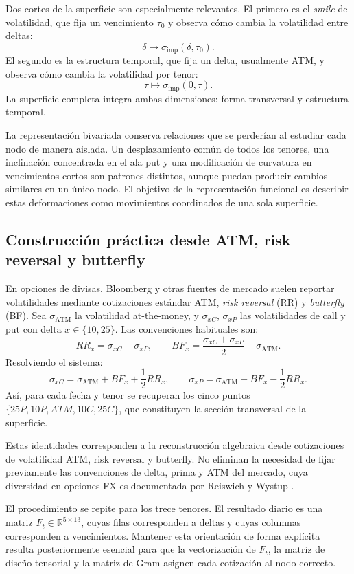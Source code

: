 \documentclass[a4paper,11pt]{article}
\newcommand{\R}{\mathbb{R}}
\begin{document}
Dos cortes de la superficie son especialmente relevantes. El primero es el \emph{smile} de volatilidad, que fija un vencimiento \(\tau_0\) y observa cómo cambia la volatilidad entre deltas:
\[
  \delta\mapsto \sigma_{\text{imp}}(\delta,\tau_0).
\]
El segundo es la estructura temporal, que fija un delta, usualmente ATM, y observa cómo cambia la volatilidad por tenor:
\[
  \tau\mapsto \sigma_{\text{imp}}(0,\tau).
\]
La superficie completa integra ambas dimensiones: forma transversal y estructura temporal.

La representación bivariada conserva relaciones que se perderían al estudiar cada nodo de manera aislada. Un desplazamiento común de todos los tenores, una inclinación concentrada en el ala put y una modificación de curvatura en vencimientos cortos son patrones distintos, aunque puedan producir cambios similares en un único nodo. El objetivo de la representación funcional es describir estas deformaciones como movimientos coordinados de una sola superficie.

\subsection{Construcción práctica desde ATM, risk reversal y butterfly}

En opciones de divisas, Bloomberg y otras fuentes de mercado suelen reportar volatilidades mediante cotizaciones estándar ATM, \emph{risk reversal} (RR) y \emph{butterfly} (BF). Sea \(\sigma_{\text{ATM}}\) la volatilidad at-the-money, y \(\sigma_{xC}\), \(\sigma_{xP}\) las volatilidades de call y put con delta \(x\in\{10,25\}\). Las convenciones habituales son:
\[
  RR_x=\sigma_{xC}-\sigma_{xP},
  \qquad
  BF_x=\frac{\sigma_{xC}+\sigma_{xP}}{2}-\sigma_{\text{ATM}}.
\]
Resolviendo el sistema:
\[
  \sigma_{xC}=\sigma_{\text{ATM}}+BF_x+\frac{1}{2}RR_x,
  \qquad
  \sigma_{xP}=\sigma_{\text{ATM}}+BF_x-\frac{1}{2}RR_x.
\]
Así, para cada fecha y tenor se recuperan los cinco puntos \(\{25P,10P,ATM,10C,25C\}\), que constituyen la sección transversal de la superficie.

Estas identidades corresponden a la reconstrucción algebraica desde cotizaciones de volatilidad ATM, risk reversal y butterfly. No eliminan la necesidad de fijar previamente las convenciones de delta, prima y ATM del mercado, cuya diversidad en opciones FX es documentada por Reiswich y Wystup \cite{ReiswichWystup2010}.

El procedimiento se repite para los trece tenores. El resultado diario es una matriz \(F_t\in\R^{5\times 13}\), cuyas filas corresponden a deltas y cuyas columnas corresponden a vencimientos. Mantener esta orientación de forma explícita resulta posteriormente esencial para que la vectorización de \(F_t\), la matriz de diseño tensorial y la matriz de Gram asignen cada cotización al nodo correcto.
\end{document}
